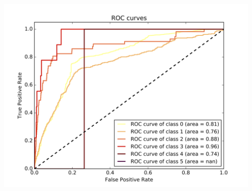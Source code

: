 \documentclass[c]{beamer}
\begin{document}
\begin{frame}
\begin{columns}
\begin{column}{0.6\textwidth}
      \centering\vfill
      \includegraphics[scale=0.18]{../../data/Suisse/test/Support_Vector_Gaussian_Classification/Support_Vector_Gaussian_Classification_roc.png}
\end{column}
\end{columns}
\end{frame}
\end{document}
